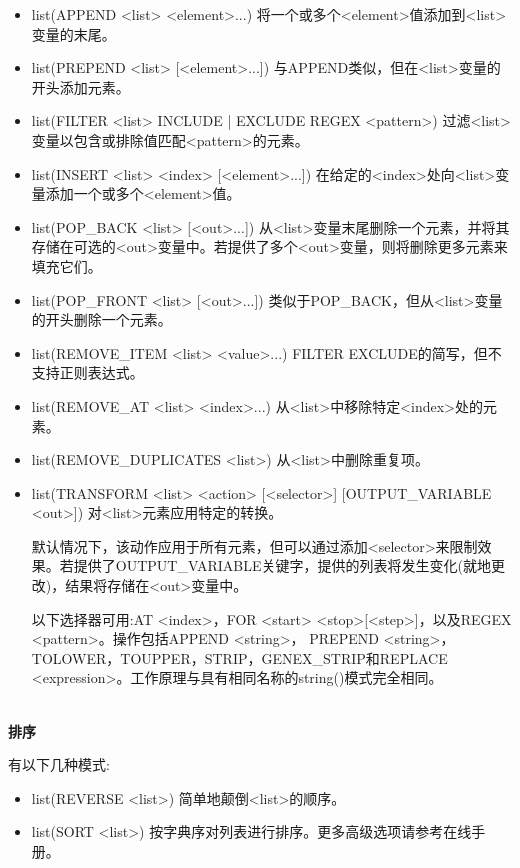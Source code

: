 \begin{itemize}
\item 
list(APPEND <list> <element>...) 将一个或多个<element>值添加到<list>变量的末尾。

\item 
list(PREPEND <list> [<element>...]) 与APPEND类似，但在<list>变量的开头添加元素。

\item 
list(FILTER <list> {INCLUDE | EXCLUDE} REGEX <pattern>) 过滤<list>变量以包含或排除值匹配<pattern>的元素。

\item 
list(INSERT <list> <index> [<element>...]) 在给定的<index>处向<list>变量添加一个或多个<element>值。

\item 
list(POP\_BACK <list> [<out>...]) 从<list>变量末尾删除一个元素，并将其存储在可选的<out>变量中。若提供了多个<out>变量，则将删除更多元素来填充它们。

\item 
list(POP\_FRONT <list> [<out>...]) 类似于POP\_BACK，但从<list>变量的开头删除一个元素。

\item 
list(REMOVE\_ITEM <list> <value>...) FILTER EXCLUDE的简写，但不支持正则表达式。

\item 
list(REMOVE\_AT <list> <index>...) 从<list>中移除特定<index>处的元素。

\item 
list(REMOVE\_DUPLICATES <list>) 从<list>中删除重复项。

\item 
list(TRANSFORM <list> <action> [<selector>] [OUTPUT\_VARIABLE <out>]) 对<list>元素应用特定的转换。

默认情况下，该动作应用于所有元素，但可以通过添加<selector>来限制效果。若提供了OUTPUT\_VARIABLE关键字，提供的列表将发生变化(就地更改)，结果将存储在<out>变量中。

以下选择器可用:AT <index>，FOR <start> <stop>[<step>]，以及REGEX <pattern>。操作包括APPEND <string>， PREPEND <string>，TOLOWER，TOUPPER，STRIP，GENEX\_STRIP和REPLACE  <expression>。工作原理与具有相同名称的string()模式完全相同。
\end{itemize}


\hspace*{\fill} \\ %
\noindent
\textbf{排序}

有以下几种模式:

\begin{itemize}
\item 
list(REVERSE <list>) 简单地颠倒<list>的顺序。

\item 
list(SORT <list>) 按字典序对列表进行排序。更多高级选项请参考在线手册。
\end{itemize}

